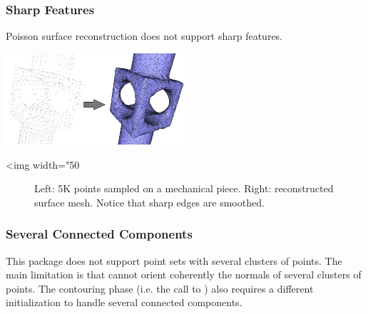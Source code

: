 \subsubsection{Sharp Features}

Poisson surface reconstruction does not support sharp features.

\begin{center}
    \label{Surface_reconstruction_points_3-fig-sharp_features}
    \begin{ccTexOnly}
      \includegraphics[width=0.5\textwidth]{Surface_reconstruction_points_3/sharp_features} %
    \end{ccTexOnly}
    \begin{ccHtmlOnly}
        <img width="50%
    \end{ccHtmlOnly}
    \begin{figure}[h]
        \caption{Left: 5K points sampled on a mechanical piece.
                 Right: reconstructed surface mesh. Notice that sharp edges are smoothed.}
    \end{figure}
\end{center}


\subsubsection{Several Connected Components}

This package does not support point sets with several clusters of points. The main limitation is that  cannot orient coherently the normals of several clusters of points. The contouring phase (i.e. the call to ) also requires a different initialization to handle several connected components.


